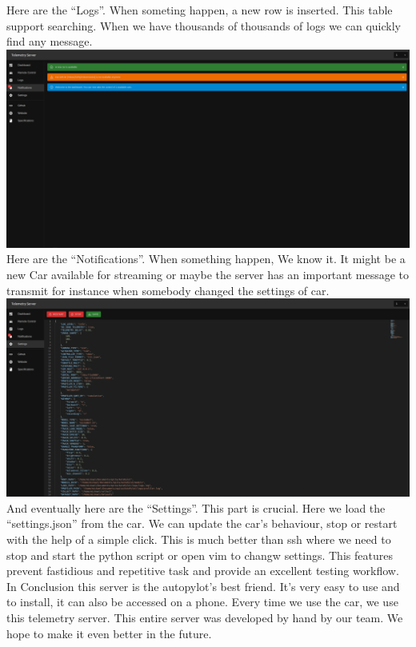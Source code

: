 \documentclass[12pt]{article}
\begin{document}
Here are the “Logs”. When someting happen, a new row is inserted. This table support searching. When we have thousands of thousands of logs we can quickly find any message.\\
\includegraphics[width=\textwidth]{../../docs/Telem4.png}\\

Here are the “Notifications”. When something happen, We know it. It might be a new Car available for streaming or maybe the server has an important message to transmit for instance when somebody changed the settings of car.\\
\includegraphics[width=\textwidth]{../../docs/Telem5.png}\\

And eventually here are the “Settings”. This part is crucial. Here we load the “settings.json” from the car. We can update the car’s behaviour, stop or restart with the help of a simple click. This is much better than ssh where we need to stop and start the python script or open vim to changw settings. This features prevent fastidious and repetitive task and provide an excellent testing workflow.\\

In Conclusion this server is the autopylot’s best friend. It’s very easy to use and to install, it can also be accessed on a phone. Every time we use the car, we use this telemetry server. This entire server was developed by hand by our team. We hope to make it even better in the future.\\
\end{document}
